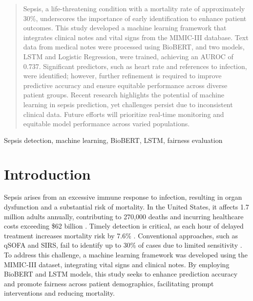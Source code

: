 \documentclass[journal]{IEEEtran}
\begin{document}
\maketitle

\begin{abstract}
Sepsis, a life-threatening condition with a mortality rate of approximately 30\%, underscores the importance of early identification to enhance patient outcomes. This study developed a machine learning framework that integrates clinical notes and vital signs from the MIMIC-III database. Text data from medical notes were processed using BioBERT, and two models, LSTM and Logistic Regression, were trained, achieving an AUROC of 0.737. Significant predictors, such as heart rate and references to infection, were identified; however, further refinement is required to improve predictive accuracy and ensure equitable performance across diverse patient groups. Recent research highlights the potential of machine learning in sepsis prediction, yet challenges persist due to inconsistent clinical data. Future efforts will prioritize real-time monitoring and equitable model performance across varied populations.
\end{abstract}

\begin{IEEEkeywords}
Sepsis detection, machine learning, BioBERT, LSTM, fairness evaluation
\end{IEEEkeywords}

\section{Introduction}
Sepsis arises from an excessive immune response to infection, resulting in organ dysfunction and a substantial risk of mortality. In the United States, it affects 1.7 million adults annually, contributing to 270,000 deaths and incurring healthcare costs exceeding \$62 billion \cite{singer2016sepsis, paoli2018epidemiology}. Timely detection is critical, as each hour of delayed treatment increases mortality risk by 7.6\% \cite{kumar2006duration}. Conventional approaches, such as qSOFA and SIRS, fail to identify up to 30\% of cases due to limited sensitivity \cite{zhou2025interpretable}. To address this challenge, a machine learning framework was developed using the MIMIC-III dataset, integrating vital signs and clinical notes. By employing BioBERT and LSTM models, this study seeks to enhance prediction accuracy and promote fairness across patient demographics, facilitating prompt interventions and reducing mortality.
\end{document}
